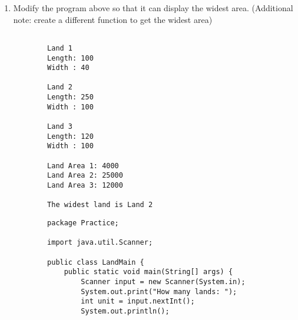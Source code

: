 \documentclass[12pt,titlepage]{article}
\begin{document}
\begin{enumerate}
\begin{verbatim}
        import java.util.Scanner;

        public class LandMain {
            public static void main(String[] args) {
                Scanner input = new Scanner(System.in);
                System.out.print("How many lands: ");
                int unit = input.nextInt();
                System.out.println();

                Land[] lands = new Land[unit];
                for (int i = 0; i < lands.length; i++) {
                    System.out.printf("Land %d\n", i+1);
                    System.out.print("length: ");
                    int l = input.nextInt();
                    System.out.print("width : ");
                    int w = input.nextInt();
                    lands[i] = new Land(l, w);
                    System.out.println();
                }
                for (int i = 0; i < lands.length; i++) {
                    System.out.printf("Land Area %d: %,d\n", i+1, lands[i].area());
                }
                input.close();
            }
        }
    \end{verbatim}
    \item Modify the program above so that it can display the widest area. (Additional note: create a different function to get the widest area)
    \mbox{}\\
    \begin{verbatim}
        
        Land 1
        Length: 100
        Width : 40

        Land 2
        Length: 250
        Width : 100

        Land 3
        Length: 120
        Width : 100

        Land Area 1: 4000
        Land Area 2: 25000
        Land Area 3: 12000
        
        The widest land is Land 2

    \end{verbatim}
    \begin{verbatim}
        package Practice;

        import java.util.Scanner;

        public class LandMain {
            public static void main(String[] args) {
                Scanner input = new Scanner(System.in);
                System.out.print("How many lands: ");
                int unit = input.nextInt();
                System.out.println();


\end{verbatim}
\end{enumerate}
\end{document}
